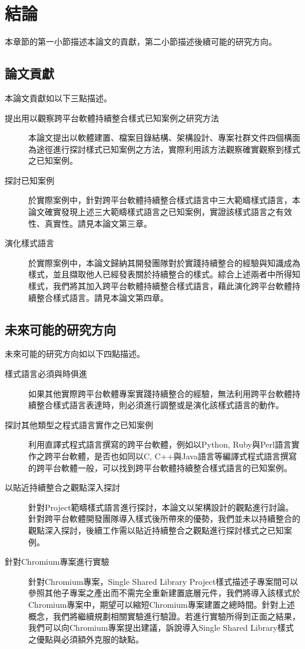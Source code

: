 \chapter{結論}
本章節的第一小節描述本論文的貢獻，第二小節描述後續可能的研究方向。
\section{論文貢獻}
本論文貢獻如以下三點描述。
\begin{description}
\item[提出用以觀察跨平台軟體持續整合樣式已知案例之研究方法] 本論文提出以軟體建置、檔案目錄結構、架構設計、專案社群文件四個構面為途徑進行探討樣式已知案例之方法，實際利用該方法觀察確實觀察到樣式之已知案例。

\item[探討已知案例] 於實際案例中，針對跨平台軟體持續整合樣式語言中三大範疇樣式語言，本論文確實發現上述三大範疇樣式語言之已知案例，實證該樣式語言之有效性、真實性。請見本論文第三章。

\item[演化樣式語言] 於實際案例中，本論文歸納其開發團隊對於實踐持續整合的經驗與知識成為樣式，並且擷取他人已經發表關於持續整合的樣式。綜合上述兩者中所得知樣式，我們將其加入跨平台軟體持續整合樣式語言，藉此演化跨平台軟體持續整合樣式語言。請見本論文第四章。
\end{description}

\section{未來可能的研究方向}
未來可能的研究方向如以下四點描述。
\begin{description}
\item [樣式語言必須與時俱進] 如果其他實際跨平台軟體專案實踐持續整合的經驗，無法利用跨平台軟體持續整合樣式語言表達時，則必須進行調整或是演化該樣式語言的動作。

\item[探討其他類型之程式語言實作之已知案例] 利用直譯式程式語言撰寫的跨平台軟體，例如以Python, Ruby與Perl語言實作之跨平台軟體，是否也如同以C, C++與Java語言等編譯式程式語言撰寫的跨平台軟體一般，可以找到跨平台軟體持續整合樣式語言的已知案例。

\item[以貼近持續整合之觀點深入探討] 針對Project範疇樣式語言進行探討，本論文以架構設計的觀點進行討論。針對跨平台軟體開發團隊導入樣式後所帶來的優勢，我們並未以持續整合的觀點深入探討，後續工作需以貼近持續整合之觀點進行探討樣式之已知案例。

\item[針對Chromium專案進行實驗] 針對Chromium專案，Single Shared Library Project樣式描述子專案間可以參照其他子專案之產出而不需完全重新建置底層元件，我們將導入該樣式於Chromium專案中，期望可以縮短Chromium專案建置之總時間。針對上述概念，我們將繼續規劃相關實驗進行驗證。若進行實驗所得到正面之結果，我們可以向Chromium專案提出建議，訴說導入Single Shared Library樣式之優點與必須額外克服的缺點。
\end{description}